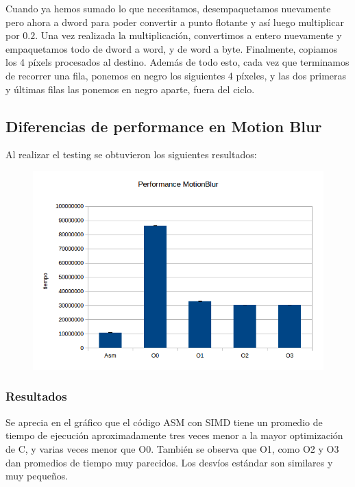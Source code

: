 \documentclass[a4paper]{article}
\begin{document}
Cuando ya hemos sumado lo que necesitamos, desempaquetamos nuevamente pero ahora a dword para poder convertir a punto flotante y así luego multiplicar por $0.2$. Una vez realizada la multiplicación, convertimos a entero nuevamente y empaquetamos todo de dword a word, y de word a byte. Finalmente, copiamos los 4 píxels procesados al destino. Además de todo esto, cada vez que terminamos de recorrer una fila, ponemos en negro los siguientes 4 píxeles, y las dos primeras y últimas filas las ponemos en negro aparte, fuera del ciclo.

\subsection{Diferencias de performance en Motion Blur}

Al realizar el testing se obtuvieron los siguientes resultados:

\begin{figure}[h!]
  \begin{center}
  \includegraphics[scale=0.66]{Graficos1.4/mbl/per.jpg}
  \label{nombreparareferenciar11}
  \end{center}
\end{figure}

\subsubsection{Resultados}
Se aprecia en el gráfico que el código ASM con SIMD tiene un promedio de tiempo de ejecución aproximadamente tres veces menor a la mayor optimización de C, y varias veces menor que O0. También se observa que O1, como O2 y O3 dan promedios de tiempo muy parecidos. Los desvíos estándar son similares y muy pequeños.
\end{document}
